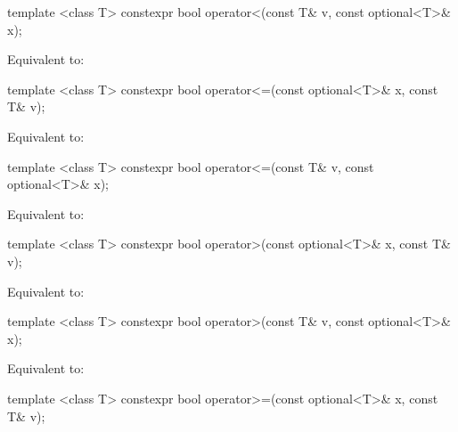 %
\begin{itemdecl}
template <class T> constexpr bool operator<(const T& v, const optional<T>& x);
\end{itemdecl}

\begin{itemdescr}
\pnum
\effects
Equivalent to: 
\end{itemdescr}

%
\begin{itemdecl}
template <class T> constexpr bool operator<=(const optional<T>& x, const T& v);
\end{itemdecl}

\begin{itemdescr}
\pnum
\effects
Equivalent to: 
\end{itemdescr}

%
\begin{itemdecl}
template <class T> constexpr bool operator<=(const T& v, const optional<T>& x);
\end{itemdecl}

\begin{itemdescr}
\pnum
\effects
Equivalent to: 
\end{itemdescr}

%
\begin{itemdecl}
template <class T> constexpr bool operator>(const optional<T>& x, const T& v);
\end{itemdecl}

\begin{itemdescr}
\pnum
\effects
Equivalent to: 
\end{itemdescr}

%
\begin{itemdecl}
template <class T> constexpr bool operator>(const T& v, const optional<T>& x);
\end{itemdecl}

\begin{itemdescr}
\pnum
\effects
Equivalent to: 
\end{itemdescr}

%
\begin{itemdecl}
template <class T> constexpr bool operator>=(const optional<T>& x, const T& v);
\end{itemdecl}

